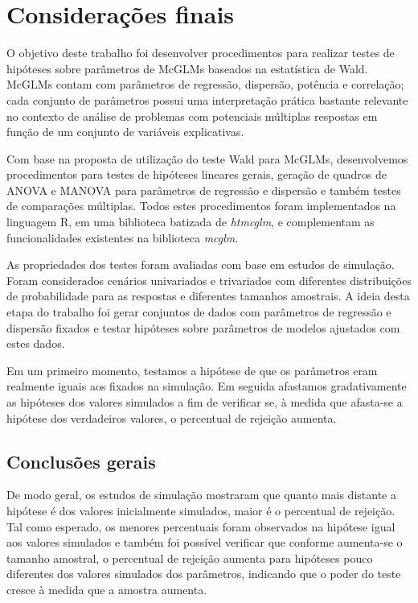 
\chapter{Considerações finais}\label{cap:conclusao}

O objetivo deste trabalho foi desenvolver procedimentos para realizar testes de hipóteses sobre parâmetros de McGLMs baseados na estatística de Wald. McGLMs contam com parâmetros de regressão, dispersão, potência e correlação; cada conjunto de parâmetros possui uma interpretação prática bastante relevante no contexto de análise de problemas com potenciais múltiplas respostas em função de um conjunto de variáveis explicativas.

Com base na proposta de utilização do teste Wald para McGLMs, desenvolvemos procedimentos para testes de hipóteses lineares gerais, geração de quadros de ANOVA e MANOVA para parâmetros de regressão e dispersão e também testes de comparações múltiplas. Todos estes procedimentos foram implementados na linguagem R, em uma biblioteca batizada de \emph{htmcglm}, e complementam as funcionalidades existentes na biblioteca \emph{mcglm}.

As propriedades dos testes foram avaliadas com base em estudos de simulação. Foram considerados cenários univariados e trivariados com diferentes distribuições de probabilidade para as respostas e diferentes tamanhos amostrais. A ideia desta etapa do trabalho foi gerar conjuntos de dados com parâmetros de regressão e dispersão fixados e testar hipóteses sobre parâmetros de modelos ajustados com estes dados. 

Em um primeiro momento, testamos a hipótese de que os parâmetros eram realmente iguais aos fixados na simulação. Em seguida afastamos gradativamente as hipóteses dos valores simulados a fim de verificar se, à medida que afasta-se a hipótese dos verdadeiros valores, o percentual de rejeição aumenta.


\section{Conclusões gerais}

De modo geral, os estudos de simulação mostraram que quanto mais distante a hipótese é dos valores inicialmente simulados, maior é o percentual de rejeição. Tal como esperado, os menores percentuais foram observados na hipótese igual aos valores simulados e também foi possível verificar que conforme aumenta-se o tamanho amostral, o percentual de rejeição aumenta para hipóteses pouco diferentes dos valores simulados dos parâmetros, indicando que o poder do teste cresce à medida que a amostra aumenta.

